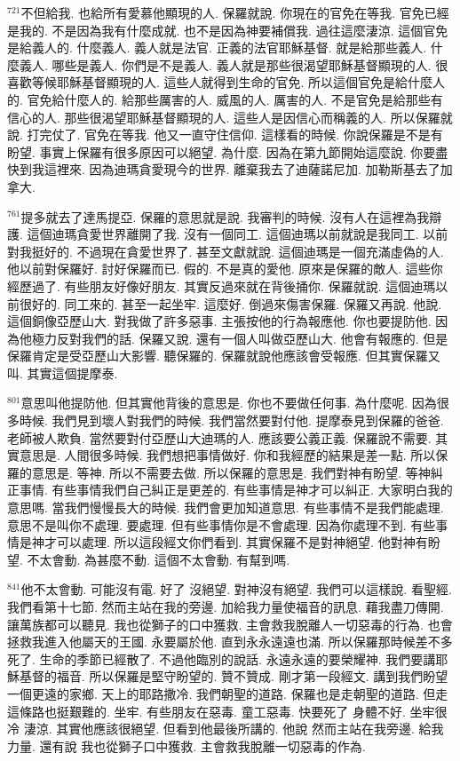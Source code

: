 \documentclass{book}
\begin{document}
$^{721}$不但給我.
也給所有愛慕他顯現的人.
保羅就說.
你現在的官免在等我.
官免已經是我的.
不是因為我有什麼成就.
也不是因為神要補償我.
過往這麼淒涼.
這個官免是給義人的.
什麼義人.
義人就是法官.
正義的法官耶穌基督.
就是給那些義人.
什麼義人.
哪些是義人.
你們是不是義人.
義人就是那些很渴望耶穌基督顯現的人.
很喜歡等候耶穌基督顯現的人.
這些人就得到生命的官免.
所以這個官免是給什麼人的.
官免給什麼人的.
給那些厲害的人.
威風的人.
厲害的人.
不是官免是給那些有信心的人.
那些很渴望耶穌基督顯現的人.
這些人是因信心而稱義的人.
所以保羅就說.
打完仗了.
官免在等我.
他又一直守住信仰.
這樣看的時候.
你說保羅是不是有盼望.
事實上保羅有很多原因可以絕望.
為什麼.
因為在第九節開始這麼說.
你要盡快到我這裡來.
因為迪瑪貪愛現今的世界.
離棄我去了迪薩諾尼加.
加勒斯基去了加拿大.

$^{761}$提多就去了達馬提亞.
保羅的意思就是說.
我審判的時候.
沒有人在這裡為我辯護.
這個迪瑪貪愛世界離開了我.
沒有一個同工.
這個迪瑪以前就說是我同工.
以前對我挺好的.
不過現在貪愛世界了.
甚至文獻就說.
這個迪瑪是一個充滿虛偽的人.
他以前對保羅好.
討好保羅而已.
假的.
不是真的愛他.
原來是保羅的敵人.
這些你經歷過了.
有些朋友好像好朋友.
其實反過來就在背後捅你.
保羅就說.
這個迪瑪以前很好的.
同工來的.
甚至一起坐牢.
這麼好.
倒過來傷害保羅.
保羅又再說.
他說.
這個銅像亞歷山大.
對我做了許多惡事.
主張按他的行為報應他.
你也要提防他.
因為他極力反對我們的話.
保羅又說.
還有一個人叫做亞歷山大.
他會有報應的.
但是保羅肯定是受亞歷山大影響.
聽保羅的.
保羅就說他應該會受報應.
但其實保羅又叫.
其實這個提摩泰.

$^{801}$意思叫他提防他.
但其實他背後的意思是.
你也不要做任何事.
為什麼呢.
因為很多時候.
我們見到壞人對我們的時候.
我們當然要對付他.
提摩泰見到保羅的爸爸.
老師被人欺負.
當然要對付亞歷山大迪瑪的人.
應該要公義正義.
保羅說不需要.
其實意思是.
人間很多時候.
我們想把事情做好.
你和我經歷的結果是差一點.
所以保羅的意思是.
等神.
所以不需要去做.
所以保羅的意思是.
我們對神有盼望.
等神糾正事情.
有些事情我們自己糾正是更差的.
有些事情是神才可以糾正.
大家明白我的意思嗎.
當我們慢慢長大的時候.
我們會更加知道意思.
有些事情不是我們能處理.
意思不是叫你不處理.
要處理.
但有些事情你是不會處理.
因為你處理不到.
有些事情是神才可以處理.
所以這段經文你們看到.
其實保羅不是對神絕望.
他對神有盼望.
不太會動.
為甚麼不動.
這個不太會動.
有幫到嗎.

$^{841}$他不太會動.
可能沒有電.
好了 沒絕望.
對神沒有絕望.
我們可以這樣說.
看聖經.
我們看第十七節.
然而主站在我的旁邊.
加給我力量使福音的訊息.
藉我盡刀傳開.
讓萬族都可以聽見.
我也從獅子的口中獲救.
主會救我脫離人一切惡毒的行為.
也會拯救我進入他屬天的王國.
永要屬於他.
直到永永遠遠也滿.
所以保羅那時候差不多死了.
生命的季節已經散了.
不過他臨別的說話.
永遠永遠的要榮耀神.
我們要講耶穌基督的福音.
所以保羅是堅守盼望的.
贊不贊成.
剛才第一段經文.
講到我們盼望一個更遠的家鄉.
天上的耶路撒冷.
我們朝聖的道路.
保羅也是走朝聖的道路.
但走這條路也挺艱難的.
坐牢.
有些朋友在惡毒.
童工惡毒.
快要死了 身體不好.
坐牢很冷 淒涼.
其實他應該很絕望.
但看到他最後所講的.
他說 然而主站在我旁邊.
給我力量.
還有說 我也從獅子口中獲救.
主會救我脫離一切惡毒的作為.
\end{document}
